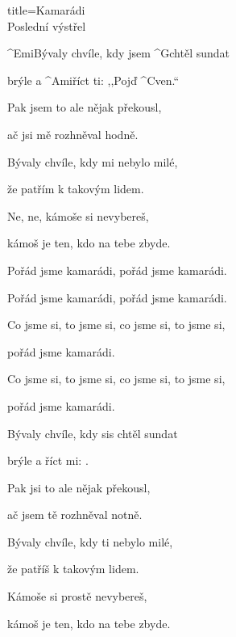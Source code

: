 \begin{song}{title=\predtitle\centering Kamarádi \\\large Poslední výstřel  \vspace*{-0.3cm}}  %
\begin{centerjustified}
\nejnejvetsi

\sloka
	^{Emi}Bývaly chvíle, kdy jsem ^{G}chtěl  sundat 
 
	brýle a ^{Ami}říct ti: ,,Pojď ^{C}ven.``

	Pak jsem to ale nějak překousl, 

	ač jsi mě rozhněval hodně.

\sloka
	Bývaly chvíle, kdy mi nebylo milé, 

	že patřím k takovým lidem. 

	Ne, ne, kámoše si nevybereš, 

	kámoš je ten, kdo na tebe zbyde.

	Pořád jsme kamarádi, pořád jsme kamarádi.

	Pořád jsme kamarádi, pořád jsme kamarádi.

	Co jsme si, to jsme si, co jsme si, to jsme si, 

	pořád jsme kamarádi.

	Co jsme si, to jsme si, co jsme si, to jsme si,

	pořád jsme kamarádi.

\sloka
	Bývaly chvíle, kdy sis chtěl sundat 

	brýle a říct mi: . 

	Pak jsi to ale nějak překousl,

	ač jsem tě rozhněval notně.

\sloka
	Bývaly chvíle, kdy ti nebylo milé,

	že patříš k takovým lidem.

	Kámoše si prostě nevybereš,

	kámoš je ten, kdo na tebe zbyde.


\end{centerjustified}
\setcounter{Slokočet}{0}
\end{song}
